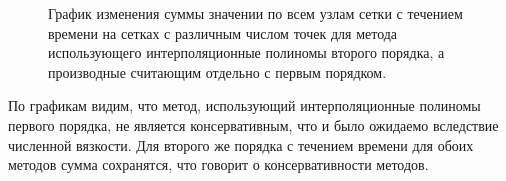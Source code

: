 \documentclass[14pt]{article}
\begin{document}
\begin{figure}[H]
\caption{График изменения суммы значении по всем узлам сетки с течением времени на сетках с различным числом точек для метода использующего интерполяционные полиномы второго порядка, а производные считающим отдельно с первым порядком.}
\end{figure}
По графикам видим, что метод, использующий интерполяционные полиномы первого порядка, не является консервативным, что и было ожидаемо вследствие численной вязкости. Для второго же порядка с течением времени для обоих методов сумма сохранятся, что говорит о консервативности методов.
\end{document}
